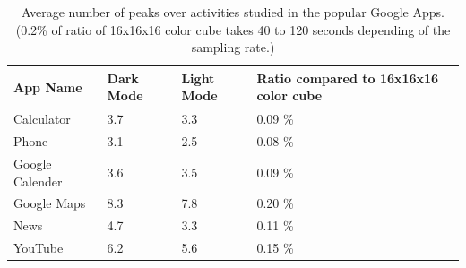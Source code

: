 

\begin{table}[th]
\begin{center}
	\centering
	\caption{Average number of peaks over activities studied in the popular Google Apps.
		(0.2\% of ratio of 16x16x16 color cube takes 40 to 120 seconds depending of the
		 sampling rate.)}
	\label{tab:activities_peaks}
        \vspace{-0.1in}
	\small {
	\begin{tabular*}{\columnwidth}{ | p{} | p{} | p{} | p{} | }
		\hline
		App Name        	&  Dark Mode & Light Mode & Ratio compared to 16x16x16 color cube\\
		\hline
		Calculator		&  3.7 & 3.3 & 0.09 \%\\
		Phone			&  3.1 & 2.5 & 0.08 \%\\
		Google Calender		&  3.6 & 3.5 & 0.09 \%\\
		Google Maps		&  8.3 & 7.8 & 0.20 \%\\  
		News			&  4.7 & 3.3 & 0.11 \%\\
		YouTube			&  6.2 & 5.6 & 0.15 \%\\
		\hline
	\end{tabular*}
	}
\end{center}
\vspace{-0.15in}
\end{table}
\fi



